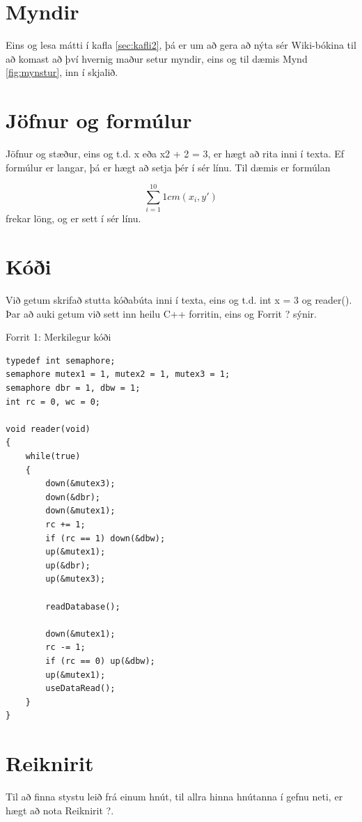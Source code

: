 \documentclass[11pt,a4paper]{article}
\theoremstyle{plain}
\theoremstyle{remark}
\begin{document}
\section{Myndir}
    Eins og lesa mátti í kafla \ref{sec:kafli2}, þá er um að gera að nýta sér Wiki-bókina til að komast að því hvernig maður setur myndir, eins og til dæmis Mynd \ref{fig:mynstur}, inn í skjalið.


\section{Jöfnur og formúlur}
    Jöfnur og stæður, eins og t.d. x eða x2 + 2 = 3, er hægt að rita inni í texta. Ef formúlur er langar, þá er hægt að setja þér í sér línu. Til dæmis er formúlan

        \[
        \sum_{i=1}^{10} 1cm(x_i,y')
        \]
frekar löng, og er sett í sér línu.

\section{Kóði}
    Við getum skrifað stutta kóðabúta inni í texta, eins og t.d. int x = 3 og reader(). Þar að auki getum við sett inn heilu C++ forritin, eins og Forrit ? sýnir.
    
\begin{center}
Forrit 1: Merkilegur kóði
\begin{lstlisting}[frame=single]
typedef int semaphore;
semaphore mutex1 = 1, mutex2 = 1, mutex3 = 1;
semaphore dbr = 1, dbw = 1;
int rc = 0, wc = 0;

void reader(void)
{
    while(true)
    {
        down(&mutex3);
        down(&dbr);
        down(&mutex1);
        rc += 1;
        if (rc == 1) down(&dbw);
        up(&mutex1);
        up(&dbr);
        up(&mutex3);

        readDatabase();

        down(&mutex1);
        rc -= 1;
        if (rc == 0) up(&dbw);
        up(&mutex1);
        useDataRead();
    }
}

\end{lstlisting} 
\end{center}

\section{Reiknirit}
    Til að finna stystu leið frá einum hnút, til allra hinna hnútanna í gefnu neti, er hægt að nota Reiknirit ?.
\end{document}

